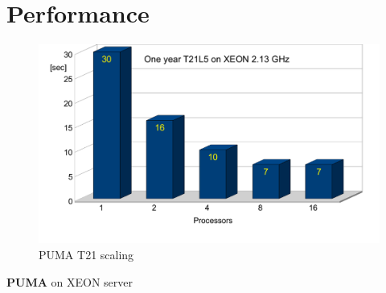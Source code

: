 \section{Performance}

\begin{figure}
   \centering
   \includegraphics[width=16cm]{Pics/pumat21.png}
   \caption[]{PUMA T21 scaling}
   \label{pumat21}
\end{figure}

{\bf PUMA} on XEON server

